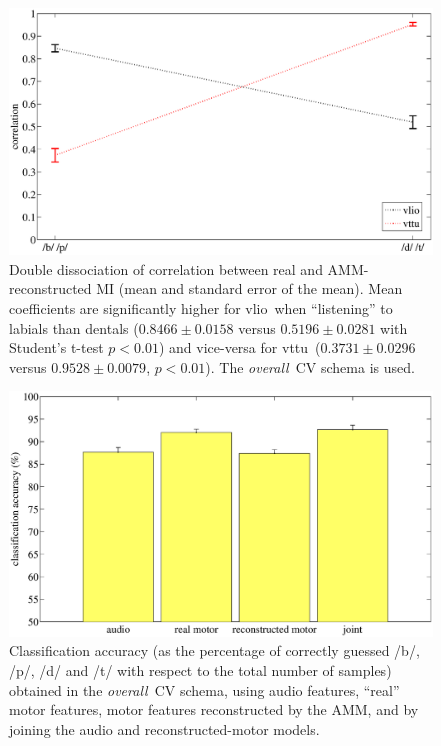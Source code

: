 \documentclass{pnastwo}
\newcommand{\vlio}{\textsf{vlio}}
\newcommand{\vttu}{\textsf{vttu}}
\newcommand{\overall}{\emph{overall}}
\begin{document}
\begin{figure}[t]
  \centerline{\includegraphics[width=\textwidth]{figs/figDD1Vel}}
  \caption{Double dissociation of correlation between real and AMM-reconstructed MI
    (mean and standard error of the mean). Mean coefficients are significantly
    higher for \vlio\ when ``listening'' to labials than dentals ($0.8466 \pm 0.0158$
    versus $0.5196 \pm 0.0281$ with Student's t-test $p<0.01$) and vice-versa
    for \vttu\ ($0.3731 \pm 0.0296$ versus $0.9528 \pm 0.0079$, $p<0.01$). The \overall\ CV
    schema is used.}
  \label{fig:DD}
\end{figure}

\begin{figure}[t]
  \centerline{\includegraphics[width=\textwidth]{figs/figClass1}}
  \caption{Classification accuracy (as the percentage of correctly guessed
    /b/, /p/, /d/ and /t/ with respect to the total number of samples) obtained
    in the \overall\ CV schema, using audio features, ``real'' motor features,
    motor features reconstructed by the AMM, and by joining the audio and
    reconstructed-motor models.}
  \label{fig:class1_perf}
\end{figure}
\end{document}
